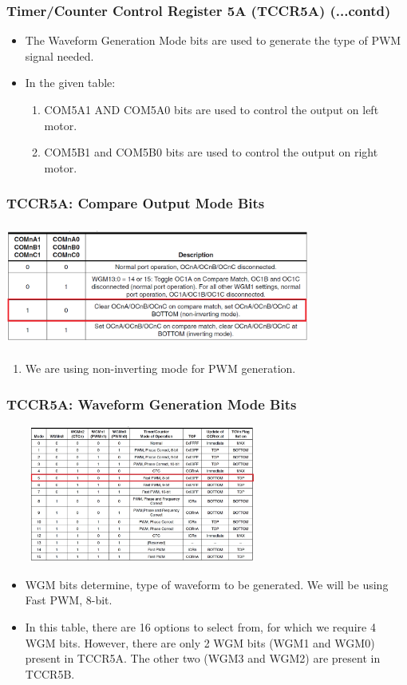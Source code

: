 \documentclass[table,10pt,red]{beamer}	%
\begin{document}
\begin{frame}
	\frametitle{Timer/Counter Control Register 5A (TCCR5A) (...contd)}
	\begin{itemize}
		\item <+-|alert@+> The Waveform Generation Mode bits are used to generate the type of PWM signal needed.
		\item <+-|alert@+> In the given table:
		\begin{enumerate} [$\checkmark$]
			\item <+-|alert@+> COM5A1 AND COM5A0 bits are used to control the output on left motor. 
			\item <+-|alert@+> COM5B1 and COM5B0 bits are used to control the output on right motor.
		\end{enumerate}
	\end{itemize}
	
\end{frame}	
\begin{frame}
\frametitle{TCCR5A: Compare Output Mode Bits}
\begin{center}
	\includegraphics[height=4cm, width=10cm]{com_bits}
\end{center}
	\begin{enumerate}
		\item <+-|alert@+> We are using non-inverting mode for PWM generation.
	\end{enumerate}
\end{frame}		
\begin{frame}
	\frametitle{TCCR5A: Waveform Generation Mode Bits}
	\centering
	\includegraphics[height=4.5cm, width=9cm]{wg_bits}
	\begin{itemize}
		\item <+-|alert@+> WGM bits determine, type of waveform to be generated. We will be using Fast PWM, 8-bit. 
		\item <+-|alert@+> In this table, there are 16 options to select from, for which we require 4 WGM bits. However, there are only 2 WGM bits (WGM1 and WGM0) present in TCCR5A. The other two (WGM3 and WGM2) are present in TCCR5B.
			\end{itemize}
     \end{frame}
\end{document}
